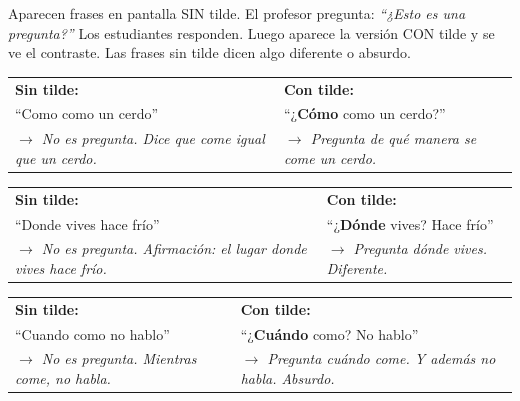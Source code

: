 \documentclass[a4paper,10pt]{article}
\renewcommand{\arraystretch}{1.3}
\begin{document}
{\small Aparecen frases en pantalla SIN tilde. El profesor pregunta: \textit{``¿Esto es una pregunta?''} Los estudiantes responden. Luego aparece la versión CON tilde y se ve el contraste. Las frases sin tilde dicen algo diferente o absurdo.}

\vspace{0.3cm}

\renewcommand{\arraystretch}{1.2}

\begin{tcolorbox}[colback=white, colframe=naranja, boxrule=0.8pt, arc=3pt, title={\textbf{Par 1}}, fonttitle=\bfseries\small]
\begin{tabular}{@{}p{7cm} p{7cm}@{}}
\textbf{Sin tilde:} & \textbf{Con tilde:} \\[4pt]
{\large ``Como como un cerdo''} & {\large ``¿\textbf{Cómo} como un cerdo?''} \\[4pt]
\textit{$\to$ No es pregunta. Dice que come igual que un cerdo.} & \textit{$\to$ Pregunta de qué manera se come un cerdo.} \\
\end{tabular}
\end{tcolorbox}

\vspace{0.2cm}

\begin{tcolorbox}[colback=white, colframe=naranja, boxrule=0.8pt, arc=3pt, title={\textbf{Par 2}}, fonttitle=\bfseries\small]
\begin{tabular}{@{}p{7cm} p{7cm}@{}}
\textbf{Sin tilde:} & \textbf{Con tilde:} \\[4pt]
{\large ``Donde vives hace frío''} & {\large ``¿\textbf{Dónde} vives? Hace frío''} \\[4pt]
\textit{$\to$ No es pregunta. Afirmación: el lugar donde vives hace frío.} & \textit{$\to$ Pregunta dónde vives. Diferente.} \\
\end{tabular}
\end{tcolorbox}

\vspace{0.2cm}

\begin{tcolorbox}[colback=white, colframe=naranja, boxrule=0.8pt, arc=3pt, title={\textbf{Par 3}}, fonttitle=\bfseries\small]
\begin{tabular}{@{}p{7cm} p{7cm}@{}}
\textbf{Sin tilde:} & \textbf{Con tilde:} \\[4pt]
{\large ``Cuando como no hablo''} & {\large ``¿\textbf{Cuándo} como? No hablo''} \\[4pt]
\textit{$\to$ No es pregunta. Mientras come, no habla.} & \textit{$\to$ Pregunta cuándo come. Y además no habla. Absurdo.} \\
\end{tabular}
\end{tcolorbox}
\end{document}
